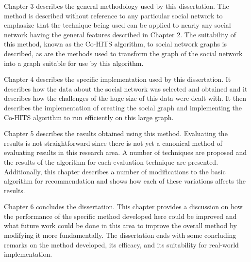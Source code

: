 Chapter 3 describes the general methodology used by this dissertation. The method is described without reference to any particular social network to emphasize that the technique being used can be applied to nearly any social network having the general features described in Chapter 2. The suitability of this method, known as the Co-HITS algorithm, to social network graphs is described, as are the methods used to transform the graph of the social network into a graph suitable for use by this algorithm.

Chapter 4 describes the specific implementation used by this dissertation. It describes how the data about the social network was selected and obtained and it describes how the challenges of the huge size of this data were dealt with. It then describes the implementation of creating the social graph and implementing the Co-HITS algorithm to run efficiently on this large graph.

Chapter 5 describes the results obtained using this method. Evaluating the results is not straightforward since there is not yet a canonical method of evaluating results in this research area. A number of techniques are proposed and the results of the algorithm for each evaluation technique are presented. Additionally, this chapter describes a number of modifications to the basic algorithm for recommendation and shows how each of these variations affects the results.

Chapter 6 concludes the dissertation. This chapter provides a discussion on how the performance of the specific method developed here could be improved and what future work could be done in this area to improve the overall method by modifying it more fundamentally. The dissertation ends with some concluding remarks on the method developed, its efficacy, and its suitability for real-world implementation.
